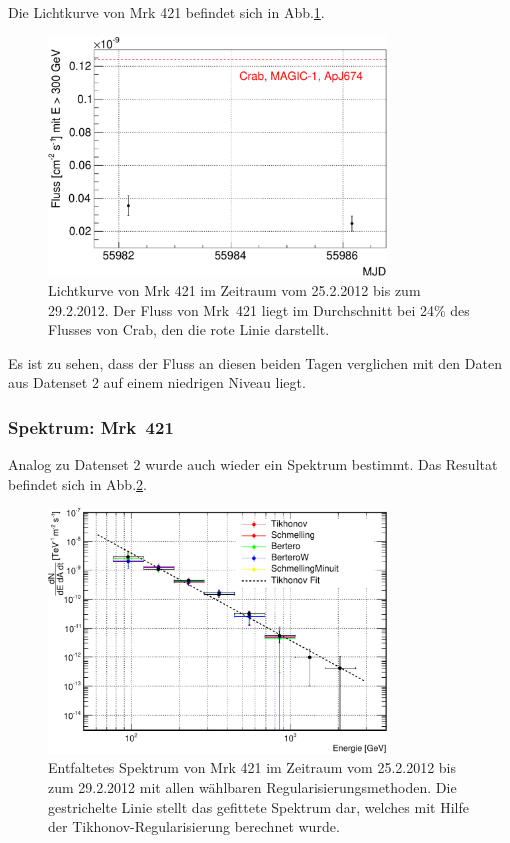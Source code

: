 Die Lichtkurve von Mrk 421 befindet sich in Abb.\ref{Datenset1_LC_Mrk421}.

\begin{figure}
    \centering
    \includegraphics[width=0.8\textwidth]{./Plots/04_MrkAnalyse/Datenset1/Datenset1_LC_Mrk421.pdf}
    \caption{Lichtkurve von Mrk 421 im Zeitraum vom 25.2.2012 bis zum 29.2.2012.
    Der Fluss von Mrk~421 liegt im Durchschnitt bei 24\% des Flusses von Crab, den die rote Linie darstellt.}
    \label{Datenset1_LC_Mrk421}
\end{figure}

Es ist zu sehen, dass der Fluss an diesen beiden Tagen verglichen mit den Daten aus Datenset 2 auf einem niedrigen Niveau liegt.



\FloatBarrier

\subsubsection{Spektrum: Mrk~421}
Analog zu Datenset 2 wurde auch wieder ein Spektrum bestimmt.
Das Resultat befindet sich in Abb.\ref{Datenset1_Spektrum_Mrk421}.

\begin{figure}
    \centering
    \includegraphics[width=0.8\textwidth]{./Plots/04_MrkAnalyse/Datenset1/Spektrum_Mrk421.pdf}
    \caption{Entfaltetes Spektrum von Mrk 421 im Zeitraum vom 25.2.2012 bis zum 29.2.2012 mit allen wählbaren Regularisierungsmethoden.
    Die gestrichelte Linie stellt das gefittete Spektrum dar, welches mit Hilfe der Tikhonov-Regularisierung berechnet wurde.}
    \label{Datenset1_Spektrum_Mrk421}
\end{figure}

